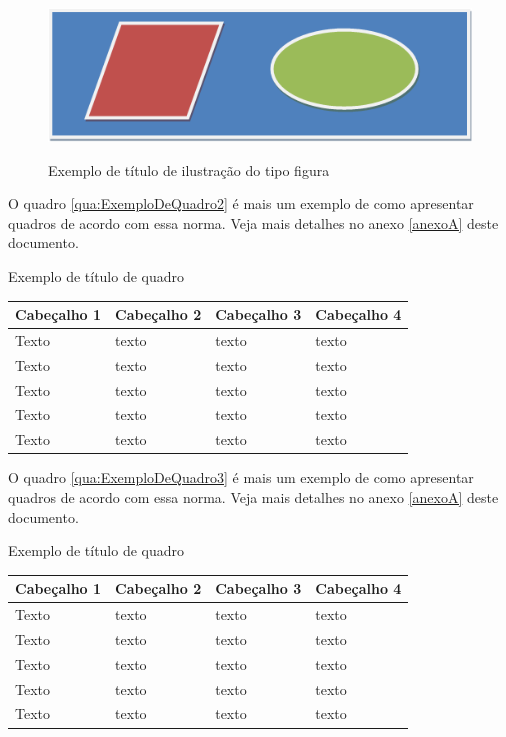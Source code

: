 \documentclass[
	12pt,				%
	oneside,			%
	a4paper,			%
	english,			%
	brazil				%
	]{abntex2ppgsi}
\begin{document}
\begin{figure}[htbp]
	\centering
	\caption{Exemplo de título de ilustração do tipo figura}
		\includegraphics{figura-exemplo.png}
	\label{fig:figura-exemplo3}
\end{figure}

O quadro \ref{qua:ExemploDeQuadro2} é mais um exemplo de como apresentar quadros de acordo com essa norma. Veja mais detalhes no anexo \ref{anexoA} deste documento.

\begin{quadro}[H]
	\centering
	\caption{Exemplo de título de quadro}
	\begin{tabular}{|p{1in} | p{1in} | p{1in} | p{1in} |} \hline
		
		Cabeçalho 1	& Cabeçalho 2	& Cabeçalho 3	& Cabeçalho 4 \\ \hline
		Texto	& texto & texto	& texto \\ \hline
		Texto	& texto & texto	& texto \\ \hline
		Texto	& texto & texto	& texto \\ \hline
		Texto	& texto & texto	& texto \\ \hline
		Texto	& texto & texto	& texto \\ \hline
		
	\end{tabular}
	\label{qua:ExemploDeQuadro2}
\end{quadro}

O quadro \ref{qua:ExemploDeQuadro3} é mais um exemplo de como apresentar quadros de acordo com essa norma. Veja mais detalhes no anexo \ref{anexoA} deste documento.

\begin{quadro}[H]
	\centering
	\caption{Exemplo de título de quadro}
	\begin{tabular}{|p{1in} | p{1in} | p{1in} | p{1in} |} \hline
		
		Cabeçalho 1	& Cabeçalho 2	& Cabeçalho 3	& Cabeçalho 4 \\ \hline
		Texto	& texto & texto	& texto \\ \hline
		Texto	& texto & texto	& texto \\ \hline
		Texto	& texto & texto	& texto \\ \hline
		Texto	& texto & texto	& texto \\ \hline
		Texto	& texto & texto	& texto \\ \hline
		
	\end{tabular}
	\label{qua:ExemploDeQuadro3}
\end{quadro}
\end{document}
